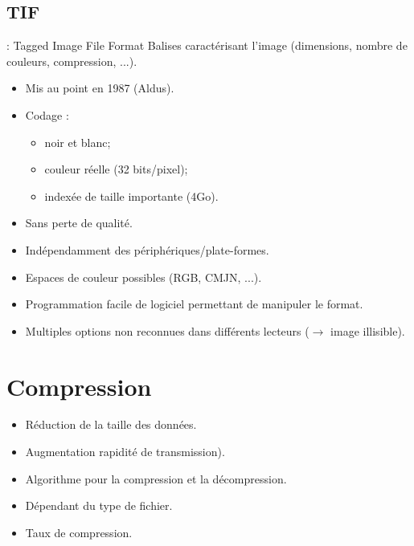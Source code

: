 \documentclass[14pt]{beamer}
\begin{document}
\subsection{TIF}
\begin{frame}[allowframebreaks]{\subsecname : Tagged Image File Format}
    Balises caractérisant l'image (dimensions, nombre de couleurs, compression, ...).
    \begin{itemize}
    \item Mis au point en 1987 (Aldus).
    \item Codage :
        \begin{itemize}
        \item noir et blanc;
        \item couleur réelle (32 bits/pixel);
        \item indexée de taille importante (4Go).
        \end{itemize}
    \item Sans perte de qualité.
    \item Indépendamment des périphériques/plate-formes.
    \item Espaces de couleur possibles (RGB, CMJN, ...).
    \item Programmation facile de logiciel permettant de manipuler le format. 
    \item Multiples options non reconnues dans différents lecteurs ($\rightarrow$ image illisible).
    \end{itemize}
\end{frame}



\section{Compression}
\begin{frame}{\secname}
    \begin{itemize}
    \item Réduction de la taille des données.
    \item Augmentation rapidité de transmission).
    \item Algorithme pour la compression et la décompression.
    \item Dépendant du type de fichier.
    \item Taux de compression.
    \end{itemize}
\end{frame}
\end{document}
